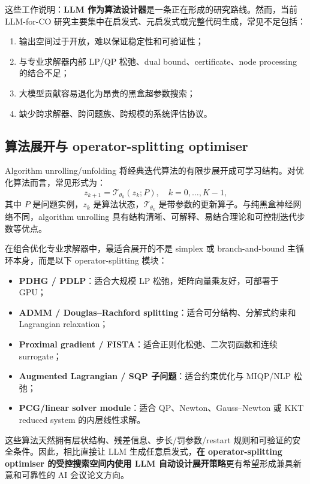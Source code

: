 \documentclass[UTF8,a4paper,12pt,fontset=fandol]{ctexart}
\begin{document}
这些工作说明：\textbf{LLM 作为算法设计器}是一条正在形成的研究路线。然而，当前 LLM-for-CO 研究主要集中在启发式、元启发式或完整代码生成，常见不足包括：
\begin{enumerate}[leftmargin=2em]
    \item 输出空间过于开放，难以保证稳定性和可验证性；
    \item 与专业求解器内部 LP/QP 松弛、dual bound、certificate、node processing 的结合不足；
    \item 大模型贡献容易退化为昂贵的黑盒超参数搜索；
    \item 缺少跨求解器、跨问题族、跨规模的系统评估协议。
\end{enumerate}

\subsection{算法展开与 operator-splitting optimiser}

Algorithm unrolling/unfolding 将经典迭代算法的有限步展开成可学习结构。对优化算法而言，常见形式为：
\begin{equation}
z_{k+1} = \mathcal{T}_{\theta_k}(z_k; P), \quad k=0,\ldots,K-1,
\end{equation}
其中 $P$ 是问题实例，$z_k$ 是算法状态，$\mathcal{T}_{\theta_k}$ 是带参数的更新算子。与纯黑盒神经网络不同，algorithm unrolling 具有结构清晰、可解释、易结合理论和可控制迭代步数等优点。

在组合优化专业求解器中，最适合展开的不是 simplex 或 branch-and-bound 主循环本身，而是以下 operator-splitting 模块：
\begin{itemize}[leftmargin=2em]
    \item \textbf{PDHG / PDLP}：适合大规模 LP 松弛，矩阵向量乘友好，可部署于 GPU；
    \item \textbf{ADMM / Douglas--Rachford splitting}：适合可分结构、分解式约束和 Lagrangian relaxation；
    \item \textbf{Proximal gradient / FISTA}：适合正则化松弛、二次罚函数和连续 surrogate；
    \item \textbf{Augmented Lagrangian / SQP 子问题}：适合约束优化与 MIQP/NLP 松弛；
    \item \textbf{PCG/linear solver module}：适合 QP、Newton、Gauss--Newton 或 KKT reduced system 的内层线性求解。
\end{itemize}

这些算法天然拥有层状结构、残差信息、步长/罚参数/restart 规则和可验证的安全条件。因此，相比直接让 LLM 生成任意启发式，\textbf{在 operator-splitting optimiser 的受控搜索空间内使用 LLM 自动设计展开策略}更有希望形成兼具新意和可靠性的 AI 会议论文方向。
\end{document}

